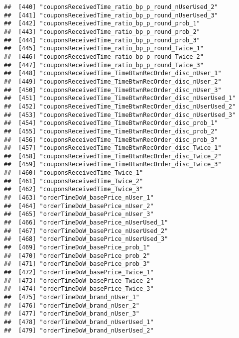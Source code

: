 \documentclass[10pt]{report}
\begin{document}
\begin{verbatim}
##  [440] "couponsReceivedTime_ratio_bp_p_round_nUserUsed_2"     
##  [441] "couponsReceivedTime_ratio_bp_p_round_nUserUsed_3"     
##  [442] "couponsReceivedTime_ratio_bp_p_round_prob_1"          
##  [443] "couponsReceivedTime_ratio_bp_p_round_prob_2"          
##  [444] "couponsReceivedTime_ratio_bp_p_round_prob_3"          
##  [445] "couponsReceivedTime_ratio_bp_p_round_Twice_1"         
##  [446] "couponsReceivedTime_ratio_bp_p_round_Twice_2"         
##  [447] "couponsReceivedTime_ratio_bp_p_round_Twice_3"         
##  [448] "couponsReceivedTime_TimeBtwnRecOrder_disc_nUser_1"    
##  [449] "couponsReceivedTime_TimeBtwnRecOrder_disc_nUser_2"    
##  [450] "couponsReceivedTime_TimeBtwnRecOrder_disc_nUser_3"    
##  [451] "couponsReceivedTime_TimeBtwnRecOrder_disc_nUserUsed_1"
##  [452] "couponsReceivedTime_TimeBtwnRecOrder_disc_nUserUsed_2"
##  [453] "couponsReceivedTime_TimeBtwnRecOrder_disc_nUserUsed_3"
##  [454] "couponsReceivedTime_TimeBtwnRecOrder_disc_prob_1"     
##  [455] "couponsReceivedTime_TimeBtwnRecOrder_disc_prob_2"     
##  [456] "couponsReceivedTime_TimeBtwnRecOrder_disc_prob_3"     
##  [457] "couponsReceivedTime_TimeBtwnRecOrder_disc_Twice_1"    
##  [458] "couponsReceivedTime_TimeBtwnRecOrder_disc_Twice_2"    
##  [459] "couponsReceivedTime_TimeBtwnRecOrder_disc_Twice_3"    
##  [460] "couponsReceivedTime_Twice_1"                          
##  [461] "couponsReceivedTime_Twice_2"                          
##  [462] "couponsReceivedTime_Twice_3"                          
##  [463] "orderTimeDoW_basePrice_nUser_1"                       
##  [464] "orderTimeDoW_basePrice_nUser_2"                       
##  [465] "orderTimeDoW_basePrice_nUser_3"                       
##  [466] "orderTimeDoW_basePrice_nUserUsed_1"                   
##  [467] "orderTimeDoW_basePrice_nUserUsed_2"                   
##  [468] "orderTimeDoW_basePrice_nUserUsed_3"                   
##  [469] "orderTimeDoW_basePrice_prob_1"                        
##  [470] "orderTimeDoW_basePrice_prob_2"                        
##  [471] "orderTimeDoW_basePrice_prob_3"                        
##  [472] "orderTimeDoW_basePrice_Twice_1"                       
##  [473] "orderTimeDoW_basePrice_Twice_2"                       
##  [474] "orderTimeDoW_basePrice_Twice_3"                       
##  [475] "orderTimeDoW_brand_nUser_1"                           
##  [476] "orderTimeDoW_brand_nUser_2"                           
##  [477] "orderTimeDoW_brand_nUser_3"                           
##  [478] "orderTimeDoW_brand_nUserUsed_1"                       
##  [479] "orderTimeDoW_brand_nUserUsed_2"                       

\end{verbatim}
\end{document}
